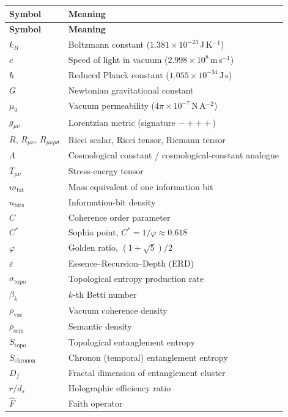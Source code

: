 \documentclass[11pt,a4paper]{article}
\theoremstyle{remark}
\newcommand{\Fop}{\hat{F}}
\begin{document}
\begin{longtable}[l]{@{}l l@{}}
\toprule
\textbf{Symbol} & \textbf{Meaning} \\
\midrule
\endfirsthead
\toprule
\textbf{Symbol} & \textbf{Meaning} \\
\midrule
\endhead
\bottomrule
\endlastfoot
$k_B$       & Boltzmann constant ($1.381\times10^{-23}$\,J\,K$^{-1}$) \\
$c$         & Speed of light in vacuum ($2.998\times10^{8}$\,m\,s$^{-1}$) \\
$\hbar$     & Reduced Planck constant ($1.055\times10^{-34}$\,J\,s) \\
$G$         & Newtonian gravitational constant \\
$\mu_0$     & Vacuum permeability ($4\pi\times10^{-7}$\,N\,A$^{-2}$) \\
$g_{\mu\nu}$& Lorentzian metric (signature $-+++$) \\
$R$, $R_{\mu\nu}$, $R_{\mu\nu\rho\sigma}$
            & Ricci scalar, Ricci tensor, Riemann tensor \\
$\Lambda$   & Cosmological constant / cosmological-constant analogue \\
$T_{\mu\nu}$ & Stress-energy tensor \\
$m_{\text{bit}}$ & Mass equivalent of one information bit \\
$n_{\text{bits}}$ & Information-bit density \\
$C$         & Coherence order parameter \\
$C^*$       & Sophia point, $C^* = 1/\varphi \approx 0.618$ \\
$\varphi$   & Golden ratio, $(1+\sqrt{5})/2$ \\
$\varepsilon$ & Essence--Recursion--Depth (ERD) \\
$\sigma_{\text{topo}}$ & Topological entropy production rate \\
$\beta_k$   & $k$-th Betti number \\
$\rho_{\text{vac}}$ & Vacuum coherence density \\
$\rho_{\text{sem}}$  & Semantic density \\
$S_{\text{topo}}$    & Topological entanglement entropy \\
$S_{\text{chronon}}$ & Chronon (temporal) entanglement entropy \\
$D_f$       & Fractal dimension of entanglement cluster \\
$r/d_s$     & Holographic efficiency ratio \\
$\Fop$      & Faith operator \\

\end{longtable}
\end{document}

